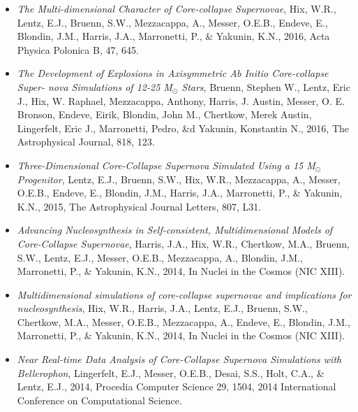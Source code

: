 \documentclass[11pt,letterpaper,english]{article}
\begin{document}
\begin{itemize}
\item {\em The Multi-dimensional Character of Core-collapse Supernovae}, Hix, W.R., Lentz, E.J., Bruenn, S.W.,  Mezzacappa, A.,  Messer, O.E.B.,  Endeve, E.,  Blondin, J.M.,  Harris, J.A., Marronetti, P., \&  Yakunin, K.N., 2016, Acta Physica Polonica B, 47, 645.


\item {\em The Development of Explosions in Axisymmetric Ab Initio Core-collapse Super- nova Simulations of 12-25 M$_\odot$   Stars}, Bruenn, Stephen W.,  Lentz, Eric J., Hix, W. Raphael, Mezzacappa, Anthony,  Harris, J. Austin,  Messer, O. E. Bronson,  Endeve, Eirik,  Blondin, John M., Chertkow, Merek Austin, Lingerfelt, Eric J., Marronetti, Pedro,  \&d Yakunin, Konstantin N., 2016, The Astrophysical Journal, 818, 123.


\item {\em Three-Dimensional Core-Collapse Supernova Simulated Using a 15 M$_\odot$   Progenitor}, Lentz, E.J., Bruenn, S.W., Hix, W.R., Mezzacappa, A.,  Messer, O.E.B., Endeve, E., Blondin, J.M., Harris, J.A., Marronetti, P., \& Yakunin, K.N.,  2015, The Astrophysical Journal Letters, 807, L31.


\item {\em Advancing Nucleosynthesis in Self-consistent, Multidimensional Models of Core-Collapse Supernovae}, Harris, J.A., Hix, W.R., Chertkow, M.A., Bruenn, S.W., Lentz, E.J., Messer, O.E.B., Mezzacappa, A.,  Blondin, J.M., Marronetti, P., \& Yakunin, K.N., 2014, In Nuclei in the Cosmos (NIC XIII).


\item {\em Multidimensional simulations of core-collapse supernovae and implications for nucleosynthesis}, Hix, W.R., Harris, J.A., Lentz, E.J., Bruenn, S.W., Chertkow, M.A., Messer, O.E.B., Mezzacappa, A., Endeve, E., Blondin, J.M., Marronetti, P., \& Yakunin, K.N., 2014, In Nuclei in the Cosmos (NIC XIII).


\item {\em Near Real-time Data Analysis of Core-Collapse Supernova Simulations with Bellerophon}, Lingerfelt, E.J., Messer, O.E.B., Desai, S.S.,  Holt, C.A.,  \& Lentz, E.J., 2014, Procedia Computer Science 29, 1504, 2014 International Conference on Computational Science.



\end{itemize}
\end{document}
